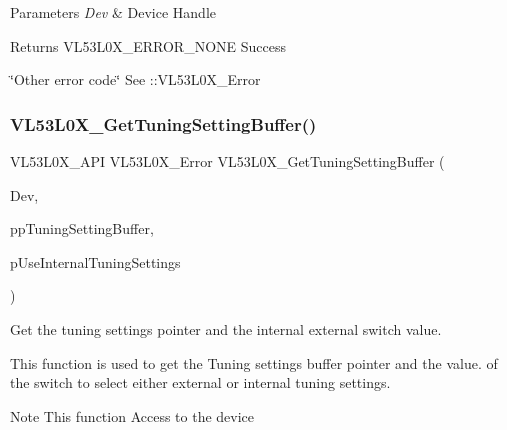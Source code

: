\begin{DoxyParams}{Parameters}
{\em Dev} & Device Handle \\
\hline
\end{DoxyParams}
\begin{DoxyReturn}{Returns}
V\+L53\+L0\+X\+\_\+\+E\+R\+R\+O\+R\+\_\+\+N\+O\+NE Success 

\char`\"{}\+Other error code\char`\"{} See \+::\+V\+L53\+L0\+X\+\_\+\+Error 
\end{DoxyReturn}
\mbox{\label{group__VL53L0X__init__group_ga6ecb2af8572433323cc3bff093bbf636}} 
\subsubsection{\texorpdfstring{V\+L53\+L0\+X\+\_\+\+Get\+Tuning\+Setting\+Buffer()}{VL53L0X\_GetTuningSettingBuffer()}}
{\footnotesize\ttfamily V\+L53\+L0\+X\+\_\+\+A\+PI V\+L53\+L0\+X\+\_\+\+Error V\+L53\+L0\+X\+\_\+\+Get\+Tuning\+Setting\+Buffer (\begin{DoxyParamCaption}\item[{\hyperlink{group__VL53L0X__platform__group_ga2d6405308b1dd524b462f1b8fb97d167}{V\+L53\+L0\+X\+\_\+\+D\+EV}}]{Dev,  }\item[{\hyperlink{vl53l0x__types_8h_aba7bc1797add20fe3efdf37ced1182c5}{uint8\+\_\+t} $\ast$$\ast$}]{pp\+Tuning\+Setting\+Buffer,  }\item[{\hyperlink{vl53l0x__types_8h_aba7bc1797add20fe3efdf37ced1182c5}{uint8\+\_\+t} $\ast$}]{p\+Use\+Internal\+Tuning\+Settings }\end{DoxyParamCaption})}



Get the tuning settings pointer and the internal external switch value. 

This function is used to get the Tuning settings buffer pointer and the value. of the switch to select either external or internal tuning settings.

\begin{DoxyNote}{Note}
This function Access to the device
\end{DoxyNote}

